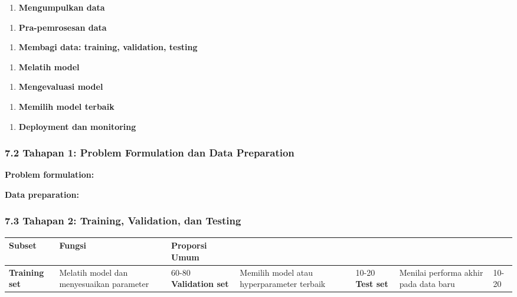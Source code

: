 \documentclass[12pt,a4paper]{article}
\begin{document}
\begin{enumerate}
\item \textbf{Mengumpulkan data}
\end{enumerate}

\begin{enumerate}
\item \textbf{Pra-pemrosesan data}
\end{enumerate}

\begin{enumerate}
\item \textbf{Membagi data: training, validation, testing}
\end{enumerate}

\begin{enumerate}
\item \textbf{Melatih model}
\end{enumerate}

\begin{enumerate}
\item \textbf{Mengevaluasi model}
\end{enumerate}

\begin{enumerate}
\item \textbf{Memilih model terbaik}
\end{enumerate}

\begin{enumerate}
\item \textbf{Deployment dan monitoring}
\end{enumerate}


\subsubsection{7.2 Tahapan 1: Problem Formulation dan Data Preparation}

\textbf{Problem formulation:}


\textbf{Data preparation:}


\subsubsection{7.3 Tahapan 2: Training, Validation, dan Testing}

\begin{tabular}{|l|l|l|}
\hline
Subset & Fungsi & Proporsi Umum \\
\hline
\textbf{Training set} & Melatih model dan menyesuaikan parameter & 60-80%
\hline
\textbf{Validation set} & Memilih model atau hyperparameter terbaik & 10-20%
\hline
\textbf{Test set} & Menilai performa akhir pada data baru & 10-20%
\hline
\end{tabular}
\end{document}
